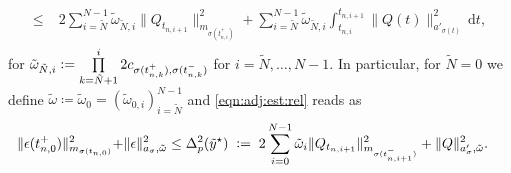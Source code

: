 \documentclass[reqno]{amsart}
\newcommand{\adState}{p}
\newcommand{\outVar}{y}
\newcommand{\dt}{\,\mathrm{d}t}
\newcommand{\switch}{\sigma}
\newcommand{\nrSwitches}{N}
\newcommand{\reduce}[1]{\tilde{#1}}
\newcommand{\addErr}{\epsilon}
\newcommand{\adResidual}{Q}
\newcommand{\outVarRed}{\reduce{\outVar}}
\newcommand{\optOutVarRed}{\outVarRed^\star}
\begin{document}
\begin{lemma}
\begin{align}
\begin{aligned}
        \le&\; 2\sum_{i=\tilde \nrSwitches }^{\nrSwitches-1}\tilde \omega_{\tilde \nrSwitches,i} \|\adResidual_{t_{n,i+1}}\|^{2}_{m_{\switch(t^{+}_{n,i})}}
    +\sum_{i=\tilde \nrSwitches }^{\nrSwitches-1}\tilde \omega_{\tilde \nrSwitches,i}\int_{t_{n,i}}^{t_{n,i+1}}\|\adResidual(t)\|_{a'_{\switch(t)}}^2 \dt,
    \end{aligned}
    \end{align}
    for $\tilde \omega_{\tilde \nrSwitches,i} \vcentcolon= \prod\limits_{k=\tilde \nrSwitches+1}^{i} 2c_{\switch(t^{+}_{n,k}),\switch(t^{-}_{n,k})} $ for $i=\tilde \nrSwitches,\ldots,N-1$.
%
In particular, for $\tilde \nrSwitches=0$ we define $\tilde \omega\coloneqq \tilde \omega_0 = (\tilde \omega_{0,i})_{i=\tilde \nrSwitches}^{N-1}$ and \eqref{eqn:adj:est:rel} reads as
    \begin{align} \label{eqn:errorBoundAdjointEnergy}
    \|\addErr(t_{n,0}^+)\|_{m_{\switch(t_{n,0})}}^2 +  &\|\addErr\|_{a_{\switch},\tilde\omega}^2
    \leq   \Delta^2_{\adState}(\optOutVarRed) \;\vcentcolon=\;2\sum\limits_{i=0}^{N-1}\tilde \omega_i \|\adResidual_{t_{n,i+1}}\|_{m_{\switch(t^-_{n,i+1})}}^2 + \|\adResidual\|_{a_\switch',\tilde \omega}^2.
    \end{align}
\end{lemma}
%
\end{document}
